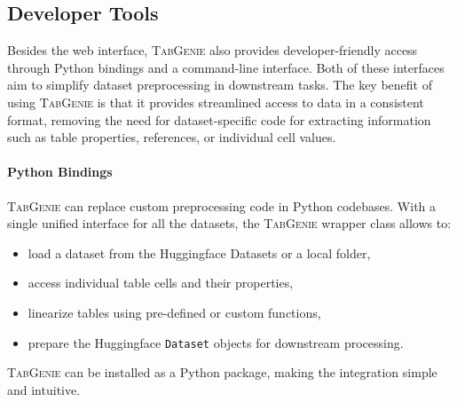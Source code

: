 \subsection{Developer Tools}
\label{sec:tabgenie:developer}
Besides the web interface, \textsc{TabGenie} also provides developer-friendly access through Python bindings and a command-line interface. Both of these interfaces aim to simplify dataset preprocessing in downstream tasks. The key benefit of using \textsc{TabGenie} is that it provides streamlined access to data in a consistent format, removing the need for dataset-specific code for extracting information such as table properties, references, or individual cell values.



\paragraph{Python Bindings} \textsc{TabGenie} can replace custom preprocessing code in Python codebases. With a single unified interface for all the datasets, the \textsc{TabGenie} wrapper class allows to:
\begin{itemize}
    \item load a dataset from the Huggingface Datasets or a local folder,
    \item access individual table cells and their properties,
    \item linearize tables using pre-defined or custom functions,
    \item prepare the Huggingface \texttt{Dataset} objects for downstream processing.
\end{itemize}
\textsc{TabGenie} can be installed as a Python package, making the integration simple and intuitive.

